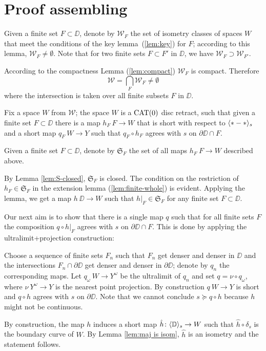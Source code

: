 \section{Proof assembling}\label{Main theorem}



Given a finite set $F\subset \DD$,
denote by $\mathcal{W}_F$
the set of isometry classes of spaces $W$ that meet the conditions of the key lemma~(\ref{lem:key})
for $F$;
according to this lemma, $\mathcal{W}_F\ne\emptyset$.
Note that for two finite sets $F\subset F'$ in $\DD$,
we have $\mathcal{W}_F\supset \mathcal{W}_{F'}$.

According to the compactness Lemma (\ref{lem:compact}) $\mathcal{W}_F$ is compact.
Therefore 
\[\mathcal{W}
=
\bigcap_{F}\mathcal{W}_F\ne \emptyset\]
where the intersection is taken over all finite subsets $F$ in $\DD$. 


Fix a space $W$ from $\mathcal{W}$;
the space $W$ is a $\mathop{\rm CAT}\nolimits(0)$ disc retract,
such that given a finite set $F\subset \DD$ there is a map $h_F\:F\to W$ that is short with 
respect to $\langle{*}-{*}\rangle_s$ 
and a short map $q_F\:W\to Y$ such that $q_F\circ h_F$ agrees with $s$ on $\partial\DD\cap F$.

Given a finite set $F\subset \DD$,
denote by $\mathfrak{S}_F$ the set of all maps $h_F\:F\to W$ described above.

By Lemma \ref{lem:S-closed}, $\mathfrak{S}_F$ is closed.
The condition on the restriction of $h_F\in  \mathfrak{S}_F$ in the extension lemma (\ref{lem:finite-whole}) is evident.
Applying the lemma,
we get a map $h\:\DD\to W$ such that $h|_F\in \mathfrak{S}_F$
for any finite set $F\subset \DD$.

Our next aim is to show that there is a single map $q$ such that
for all finite sets $F$ the composition $q\circ h|_F$ agrees with
$s$ on $\partial\DD\cap F$.
This is done by applying the ultralimit+projection construction:

Choose a sequence of finite sets $F_n$ such that $F_n$ get denser and denser in $\DD$ and
the intersections $F_n\cap\partial \DD$ get denser and denser in $\partial \DD$; 
denote by $q_n$ the corresponding maps.
Let $q_\omega\:W\to Y^\omega$ be the ultralimit of $q_n$ and set $q=\nu\circ q_\omega$,
where $\nu\:Y^\omega\to Y$ is the nearest point projection.
By construction $q\:W\to Y$ is short and $q\circ h$ agrees with $s$ on $\partial \DD$.
Note that we cannot conclude $s\succcurlyeq q\circ h$ because $h$ might not be continuous.

By construction, the map $h$ induces a short map $\hat h\colon\langle\mathbb{D}\rangle_s\to W$ 
such that $\hat h\circ\delta_s$ is the boundary curve of $W$.
By Lemma \ref{lem:maj is isom}, $\hat h$ is an isometry and the statement follows.
\qeds
